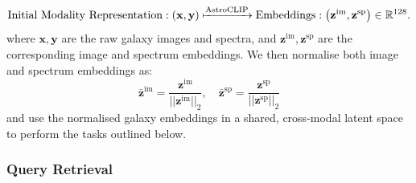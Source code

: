 \documentclass[draft, a4paper,12pt]{article}
\begin{document}
\begin{equation}
    \text{Initial Modality Representation} : \left( \mathbf{x}, \mathbf{y} \right) \xmapsto{\text{AstroCLIP}} \text{Embeddings} : \left( \mathbf{z}^{\text{im}}, \mathbf{z}^{\text{sp}} \right) \in \mathbb{R}^{128}.
\end{equation}
where $\mathbf{x}, \mathbf{y}$ are the raw galaxy images and spectra, and $\mathbf{z}^{\text{im}}, \mathbf{z}^{\text{sp}}$ are the corresponding image and spectrum embeddings. We then normalise both image and spectrum embeddings as:
\begin{equation}
    \mathbf{\bar{z}}^{\text{im}} =  \frac{\mathbf{z}^{\text{im}} }{|| \mathbf{z}^{\text{im}} ||_2}, \quad \mathbf{\bar{z}}^{\text{sp}} =  \frac{\mathbf{z}^{\text{sp}} }{|| \mathbf{z}^{\text{sp}} ||_2}
\end{equation}
and use the normalised galaxy embeddings in a shared, cross-modal latent space to perform the tasks outlined below.


\subsubsection{Query Retrieval}

\end{document}
